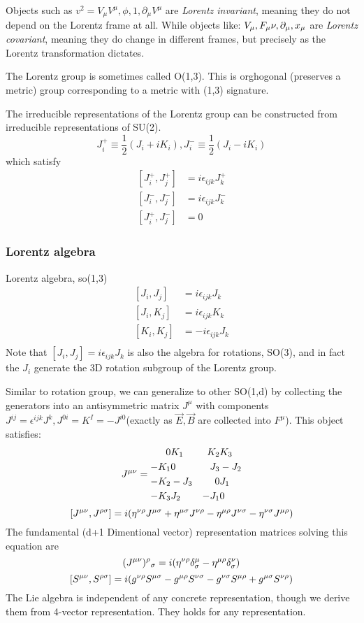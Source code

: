 Objects such as $v^2 = V_\mu V^\mu, \phi, 1, \partial_\mu V^\mu$ are
\emph{Lorentz invariant}, meaning they do not depend on the Lorentz frame at
all. While objects like: $V_\mu, F_\mu\nu, \partial_\mu, x_\mu$ are
\emph{Lorentz covariant}, meaning they do change in different frames, but
precisely as the Lorentz transformation dictates.

The Lorentz group is sometimes called O(1,3). This is orghogonal (preserves
a metric) group corresponding to a metric with (1,3) signature.

The irreducible representations of the Lorentz group can be constructed from
irreducible representations of SU(2). 
\[
    J^+_i \equiv \frac{1}{2}(J_i + iK_i), 
    J^-_i \equiv \frac{1}{2}(J_i - iK_i)
\]
which satisfy
\[
    \begin{aligned}
	[J^+_i, J^+_j] &= i\epsilon_{ijk}J^+_k    \\
	[J^-_i, J^-_j] &= i\epsilon_{ijk}J^-_k    \\
	[J^+_i, J^-_j] &= 0 
    \end{aligned}
\]

\subsubsection{Lorentz algebra}
Lorentz algebra, so(1,3)
\[
    \begin{aligned}
	[J_i, J_j] &= i\epsilon_{ijk}J_k    \\
	[J_i, K_j] &= i\epsilon_{ijk}K_k    \\
	[K_i, K_j] &= -i\epsilon_{ijk}J_k    \\
    \end{aligned}
\]
Note that $ [J_i, J_j] = i\epsilon_{ijk}J_k $ is also the algebra for
rotations, SO(3), and in fact the $J_i$ generate the 3D rotation subgroup of
the Lorentz group.

Similar to rotation group, we can generalize to other SO(1,d) by collecting
the generators into an antisymmetric matrix $J^{\mu}$ with components
$J^{ij} = \epsilon^{ijk}J^k, J^{0i} = K^I = -J^{i0}$(exactly as $\vec{E},
\vec{B}$ are collected into $F^{\mu}$). This object satisfies:
\[
    J^{\mu\nu}=
    \begin{aligned}
	0   & K_1   & K_2   & K_3   \\
	-K_1	& 0 & J_3   & -J_2  \\
	-K_2	& -J_3	& 0 & J_1   \\
	-K_3	& J_2	& -J_1	& 0 \\
    \end{aligned}
    \]
\[
    [J^{\mu\nu}, J^{\rho\sigma}]=
    i( \eta^{\nu\rho}J^{\mu\sigma}
    +\eta^{\mu\sigma}J^{\nu\rho} 
    -\eta^{\mu\rho}J^{\nu\sigma}
    -\eta^{\nu\sigma}J^{\mu\rho}
    )
    \]
The fundamental (d+1 Dimentional vector) representation matrices solving
this equation are 
\[
    (J^{\mu\nu})^\rho{}_\sigma = i(\eta^{\nu\rho}\delta^{\mu}_\sigma -
    \eta^{\mu\rho}\delta^{\nu}_{\sigma})
    \]
\[
    [S^{\mu\nu}, S^{\rho\sigma}]=
    i( g^{\nu\rho}S^{\mu\sigma}
    -g^{\mu\rho}S^{\nu\sigma}
    -g^{\nu\sigma}S^{\mu\rho}
    +g^{\mu\sigma}S^{\nu\rho} )
    \]
The Lie algebra is independent of any concrete representation, though we
derive them from 4-vector representation. They holds for any representation.

